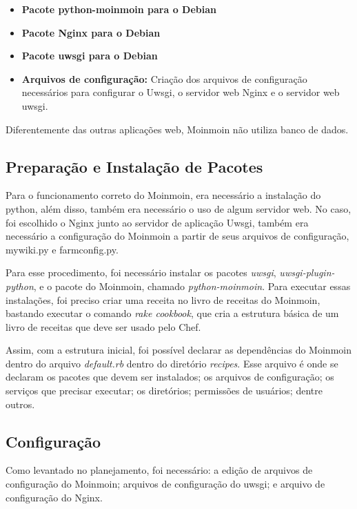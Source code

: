 \begin{itemize}
   \item \textbf{Pacote python-moinmoin para o Debian}
   \item \textbf{Pacote Nginx para o Debian}
   \item \textbf{Pacote uwsgi para o Debian}
   \item \textbf{Arquivos de configuração:} Criação dos arquivos de configuração
   necessários para configurar o Uwsgi, o servidor web Nginx e o servidor web
uwsgi.
\end{itemize}

Diferentemente das outras aplicações web, Moinmoin não utiliza banco de dados.

\subsection{Preparação e Instalação de Pacotes}

Para o funcionamento correto do Moinmoin, era necessário a instalação do python, além
disso, também era necessário o uso de algum servidor web. No caso, foi escolhido o Nginx
junto ao servidor de aplicação Uwsgi, também era necessário a configuração do 
Moinmoin a partir de seus
arquivos de configuração, mywiki.py e farmconfig.py.

Para esse procedimento, foi necessário instalar os pacotes \textit{uwsgi},
\textit{uwsgi-plugin-python}, e o pacote do Moinmoin, chamado \textit{python-moinmoin}.
Para executar essas instalações, foi preciso criar uma receita no livro de receitas
do Moinmoin, bastando executar o comando \textit{rake cookbook}, que cria a
estrutura básica de um livro de receitas que deve ser usado pelo Chef.

Assim, com a estrutura inicial, foi possível declarar as dependências do Moinmoin
dentro do arquivo \textit{default.rb} dentro do diretório \textit{recipes}. Esse arquivo 
é onde se declaram os pacotes que devem ser instalados; os arquivos de configuração;
os serviços que precisar executar; os diretórios; permissões de usuários; dentre outros.

\subsection{Configuração}

Como levantado no planejamento, foi necessário: a edição de arquivos de configuração
do Moinmoin; arquivos de configuração do uwsgi; e arquivo de configuração
do Nginx.

